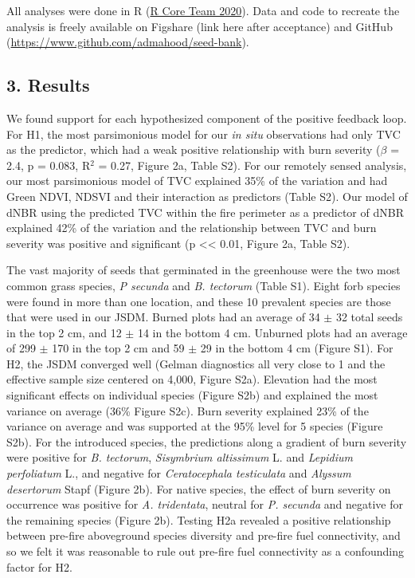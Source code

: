 \documentclass[
  12pt,
]{article}
\begin{document}
All analyses were done in R (\protect\hyperlink{ref-R}{R Core Team
2020}). Data and code to recreate the analysis is freely available on
Figshare (link here after acceptance) and GitHub
(\url{https://www.github.com/admahood/seed-bank}).

\hypertarget{results}{%
\subsection{3. Results}\label{results}}

We found support for each hypothesized component of the positive
feedback loop. For H1, the most parsimonious model for our \emph{in
situ} observations had only TVC as the predictor, which had a weak
positive relationship with burn severity (\(\beta\) = 2.4, p = 0.083,
R\(^2\) = 0.27, Figure 2a, Table S2). For our remotely sensed analysis,
our most parsimonious model of TVC explained 35\% of the variation and
had Green NDVI, NDSVI and their interaction as predictors (Table S2).
Our model of dNBR using the predicted TVC within the fire perimeter as a
predictor of dNBR explained 42\% of the variation and the relationship
between TVC and burn severity was positive and significant (p
\textless\textless{} 0.01, Figure 2a, Table S2).

The vast majority of seeds that germinated in the greenhouse were the
two most common grass species, \emph{P secunda} and \emph{B. tectorum}
(Table S1). Eight forb species were found in more than one location, and
these 10 prevalent species are those that were used in our JSDM. Burned
plots had an average of 34 \(\pm\) 32 total seeds in the top 2 cm, and
12 \(\pm\) 14 in the bottom 4 cm. Unburned plots had an average of 299
\(\pm\) 170 in the top 2 cm and 59 \(\pm\) 29 in the bottom 4 cm (Figure
S1). For H2, the JSDM converged well (Gelman diagnostics all very close
to 1 and the effective sample size centered on 4,000, Figure S2a).
Elevation had the most significant effects on individual species (Figure
S2b) and explained the most variance on average (36\% Figure S2c). Burn
severity explained 23\% of the variance on average and was supported at
the 95\% level for 5 species (Figure S2b). For the introduced species,
the predictions along a gradient of burn severity were positive for
\emph{B. tectorum}, \emph{Sisymbrium altissimum} L. and \emph{Lepidium
perfoliatum} L., and negative for \emph{Ceratocephala testiculata} and
\emph{Alyssum desertorum} Stapf (Figure 2b). For native species, the
effect of burn severity on occurrence was positive for \emph{A.
tridentata}, neutral for \emph{P. secunda} and negative for the
remaining species (Figure 2b). Testing H2a revealed a positive
relationship between pre-fire aboveground species diversity and pre-fire
fuel connectivity, and so we felt it was reasonable to rule out pre-fire
fuel connectivity as a confounding factor for H2.
\end{document}
